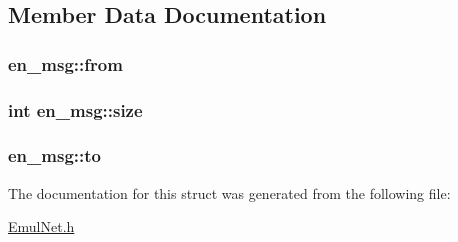 \subsection{\-Member \-Data \-Documentation}
\hypertarget{structen__msg_adbad5e8a9e8b7711d36d0c5d24f1c450}{
\subsubsection[{from}]{ {\bf en\-\_\-msg\-::from}}}\label{db/db3/structen__msg_adbad5e8a9e8b7711d36d0c5d24f1c450}
\hypertarget{structen__msg_a27abf25d730baec522335832f45aa326}{
\subsubsection[{size}]{\setlength{\rightskip}{0pt plus 5cm}int {\bf en\-\_\-msg\-::size}}}\label{db/db3/structen__msg_a27abf25d730baec522335832f45aa326}
\hypertarget{structen__msg_a20e7e03059b603a54a98841ffcc56501}{
\subsubsection[{to}]{ {\bf en\-\_\-msg\-::to}}}\label{db/db3/structen__msg_a20e7e03059b603a54a98841ffcc56501}


\-The documentation for this struct was generated from the following file\-:\begin{DoxyCompactItemize}
\item 
\hyperlink{_emul_net_8h}{\-Emul\-Net.\-h}\end{DoxyCompactItemize}
